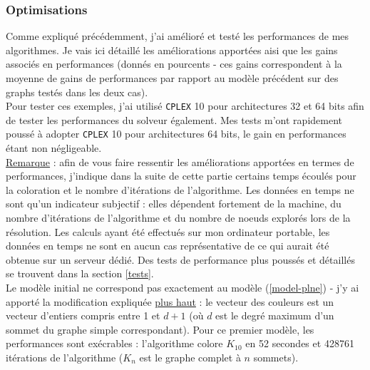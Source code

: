 \subsubsection{Optimisations}
\label{opt}
Comme expliqué précédemment, j'ai amélioré et testé les performances de mes algorithmes.
Je vais ici détaillé les améliorations apportées aisi que les gains associés en performances
(donnés en pourcents - ces gains correspondent à la moyenne de gains de performances par rapport au modèle
précédent sur des graphs testés dans les deux cas).\\
Pour tester ces exemples, j'ai utilisé \verb?CPLEX? 10 pour architectures 32 et 64 bits afin
de tester les performances du solveur également. Mes tests m'ont rapidement poussé à adopter
\verb?CPLEX? 10 pour architectures 64 bits, le gain en performances étant non négligeable.\\

\underline{Remarque} : afin de vous faire ressentir les améliorations apportées en termes de
performances, j'indique dans la suite de cette partie certains temps écoulés pour la coloration et le
nombre d'itérations de l'algorithme.
Les données en temps ne sont qu'un indicateur subjectif : elles dépendent fortement de la machine,
du nombre d'itérations de l'algorithme et du nombre de noeuds explorés lors de la résolution.
Les calculs ayant été effectués sur mon ordinateur
portable, les données en temps ne sont en aucun cas représentative de ce qui aurait été obtenue
sur un serveur dédié. Des tests de performance plus poussés et détaillés se trouvent
dans la section \ref{tests}.\\

Le modèle initial ne correspond pas exactement au modèle (\ref{model-plne}) - j'y ai apporté la
modification expliquée \hyperlink{maxc}{plus haut} : le vecteur des couleurs est un
vecteur d'entiers compris entre 1 et $d+1$ (où $d$ est le degré maximum d'un sommet du graphe simple
correspondant). Pour ce premier modèle, les performances sont exécrables : l'algorithme
colore $K_{10}$ en 52 secondes et 428761 itérations de l'algorithme
($K_n$ est le graphe complet à $n$ sommets).\\

